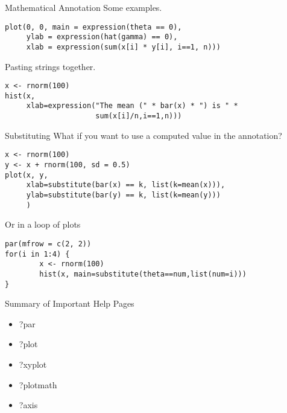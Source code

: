 \documentclass[aspectratio=169]{beamer}
\begin{document}
\begin{frame}[fragile]{Mathematical Annotation}
Some examples.
\begin{verbatim}
plot(0, 0, main = expression(theta == 0), 
     ylab = expression(hat(gamma) == 0),
     xlab = expression(sum(x[i] * y[i], i==1, n)))
\end{verbatim}
Pasting strings together.
\begin{verbatim}
x <- rnorm(100)
hist(x, 
     xlab=expression("The mean (" * bar(x) * ") is " * 
                     sum(x[i]/n,i==1,n)))
\end{verbatim}
\end{frame}

\begin{frame}[fragile]{Substituting}
What if you want to use a computed value in the annotation?
\begin{verbatim}
x <- rnorm(100)
y <- x + rnorm(100, sd = 0.5)
plot(x, y, 
     xlab=substitute(bar(x) == k, list(k=mean(x))),
     ylab=substitute(bar(y) == k, list(k=mean(y)))
     )
\end{verbatim}
Or in a loop of plots
\begin{verbatim}
par(mfrow = c(2, 2))
for(i in 1:4) {
        x <- rnorm(100)
        hist(x, main=substitute(theta==num,list(num=i)))
}
\end{verbatim}
\end{frame}


\begin{frame}{Summary of Important Help Pages}
\begin{itemize}
\item
?par
\item
?plot
\item
?xyplot
\item
?plotmath
\item
?axis
\end{itemize}
\end{frame}
\end{document}
